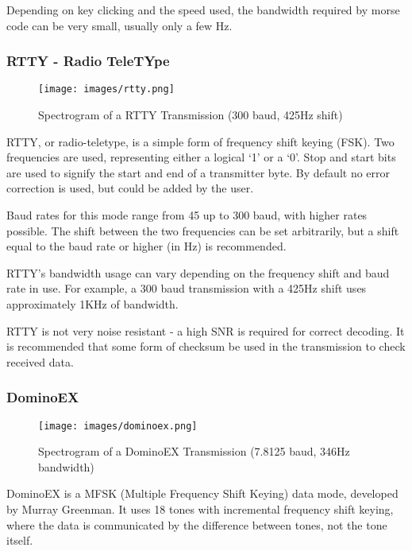\documentclass[a4paper,12pt]{article}
\begin{document}
Depending on key clicking and the speed used, the bandwidth required by morse code can be very small, usually only a few Hz.

\subsubsection*{RTTY - Radio TeleTYpe}
\begin{figure}[h]
  \begin{center}
    \texttt{[image: images/rtty.png]}
  \end{center}
  \caption{Spectrogram of a RTTY Transmission (300 baud, 425Hz shift)}
  \label{fig:rtty}
\end{figure}
RTTY, or radio-teletype, is a simple form of frequency shift keying (FSK). Two frequencies are used, representing either a logical `1' or a `0'. Stop and start bits are used to signify the start and end of a transmitter byte. By default no error correction is used, but could be added by the user.

Baud rates for this mode range from 45 up to 300 baud, with higher rates possible. The shift between the two frequencies can be set arbitrarily, but a shift equal to the baud rate or higher (in Hz) is recommended.

RTTY's bandwidth usage can vary depending on the frequency shift and baud rate in use. For example, a 300 baud transmission with a 425Hz shift uses approximately 1KHz of bandwidth. 

RTTY is not very noise resistant - a high SNR is required for correct decoding. It is recommended that some form of checksum be used in the transmission to check received data.

\subsubsection*{DominoEX}
\begin{figure}[h]
  \begin{center}
    \texttt{[image: images/dominoex.png]}
  \end{center}
  \caption{Spectrogram of a DominoEX Transmission (7.8125 baud, 346Hz bandwidth)}
  \label{fig:dominoex}
\end{figure}
DominoEX is a MFSK (Multiple Frequency Shift Keying) data mode, developed by Murray Greenman\citep{ref:dominoex}. It uses 18 tones with incremental frequency shift keying, where the data is communicated by the difference between tones, not the tone itself.
\end{document}
